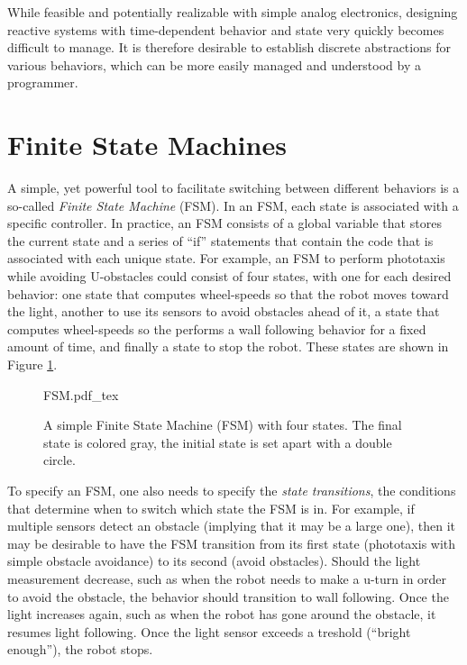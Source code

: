 While feasible and potentially realizable with simple analog electronics, designing reactive systems with time-dependent behavior and state very quickly becomes difficult to manage. It is therefore desirable to establish discrete abstractions for various behaviors, which can be more easily managed and understood by a programmer.
%
%
\section{Finite State Machines}\label{sec:fsm}
A simple, yet powerful tool to facilitate switching between different behaviors is a so-called \emph{Finite State Machine} (FSM). In an FSM, each state is associated with a specific controller. In practice, an FSM consists of a global variable that stores the current state and a series of ``if'' statements that contain the code that is associated with each unique state. For example, an FSM to perform phototaxis while avoiding U-obstacles could consist of four states, with one for each desired behavior: one state that computes wheel-speeds so that the robot moves toward the light, another to use its sensors to avoid obstacles ahead of it, a state that computes wheel-speeds so the performs a wall following behavior for a fixed amount of time, and finally a state to stop the robot. These states are shown in Figure \ref{fig:fsm}.

\begin{figure}
\centering
    \small
    \def\svgwidth{0.9\textwidth}
    {FSM.pdf_tex}
\caption{A simple Finite State Machine (FSM) with four states. The final state is colored gray, the initial state is set apart with a double circle.\label{fig:fsm}}
\end{figure}


To specify an FSM, one also needs to specify the \emph{state transitions}, the conditions that determine when to switch which state the FSM is in. For example, if multiple sensors detect an obstacle (implying that it may be a large one), then it may be desirable to have the FSM transition from its first state (phototaxis with simple obstacle avoidance) to its second (avoid obstacles). Should the light measurement decrease, such as when the robot needs to make a u-turn in order to avoid the obstacle, the behavior should transition to wall following. Once the light increases again, such as when the robot has gone around the obstacle, it resumes light following. Once the light sensor exceeds a treshold (``bright enough''), the robot stops. 

